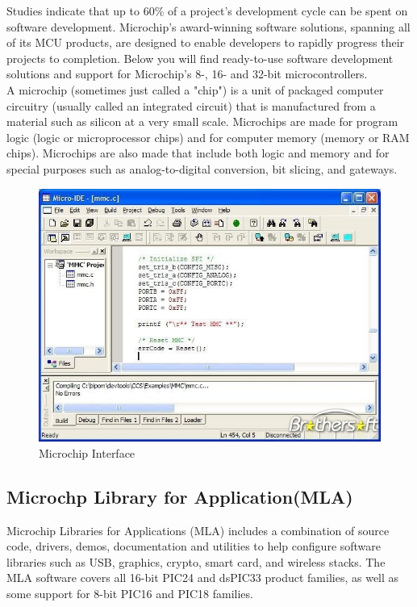 \documentclass[twoside,a4paper,16pt]{book}
\begin{document}
{{			Studies indicate that up to 60\% of a project’s development cycle can be spent on software development. Microchip’s award-winning software solutions, spanning all of its MCU products, are designed to enable developers to rapidly progress their projects to completion. Below you will find ready-to-use software development solutions and support for Microchip’s 8-, 16- and 32-bit microcontrollers.\\
			A microchip (sometimes just called a "chip") is a unit of packaged computer circuitry (usually called an integrated circuit) that is manufactured from a material such as silicon at a very small scale. Microchips are made for program logic (logic or microprocessor chips) and for computer memory (memory or RAM chips). Microchips are also made that include both logic and memory and for special purposes such as analog-to-digital conversion, bit slicing, and gateways.
			\begin{figure}[ht!]
				\begin{center}
					\includegraphics[width=15.0cm]{3.jpeg}
					\caption{Microchip Interface}
				\end{center}
			\end{figure}
			
			
			\subsection*{Microchp Library for Application(MLA)}
			Microchip Libraries for Applications (MLA) includes a combination of source code, drivers, demos, documentation and utilities to help configure software libraries such as USB, graphics, crypto, smart card, and wireless stacks. The MLA software covers all 16-bit PIC24 and dsPIC33 product families, as well as some support for 8-bit PIC16 and PIC18 families.\\
}}
\end{document}
